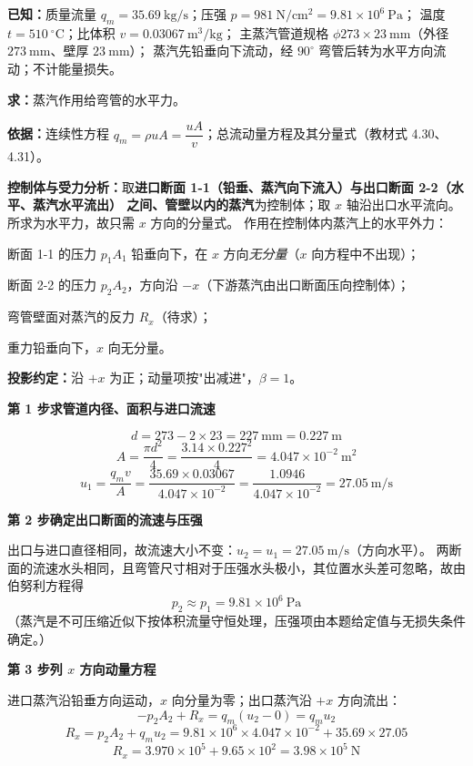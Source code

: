 \begin{jie}
\textbf{已知：}质量流量 $q_m=35.69\ \mathrm{kg/s}$；压强 $p=981\ \mathrm{N/cm^2}=9.81\times10^6\ \mathrm{Pa}$；
温度 $t=510\ \mathrm{^\circ C}$；比体积 $v=0.03067\ \mathrm{m^3/kg}$；
主蒸汽管道规格 $\phi 273\times23\ \mathrm{mm}$（外径 $273\ \mathrm{mm}$、壁厚 $23\ \mathrm{mm}$）；
蒸汽先铅垂向下流动，经 $90^\circ$ 弯管后转为水平方向流动；不计能量损失。

\textbf{求：}蒸汽作用给弯管的水平力。

\textbf{依据：}连续性方程 $q_m=\rho uA=\dfrac{uA}{v}$；总流动量方程及其分量式（教材式 4.30、4.31）。

\textbf{控制体与受力分析：}取\textbf{进口断面 1-1（铅垂、蒸汽向下流入）与出口断面 2-2（水平、蒸汽水平流出）
之间、管壁以内的蒸汽}为控制体；取 $x$ 轴沿出口水平流向。所求为水平力，故只需 $x$ 方向的分量式。
作用在控制体内蒸汽上的水平外力：
\begin{xiaowen}
\item 断面 1-1 的压力 $p_1A_1$ 铅垂向下，在 $x$ 方向\emph{无分量}（$x$ 向方程中不出现）；
\item 断面 2-2 的压力 $p_2A_2$，方向沿 $-x$（下游蒸汽由出口断面压向控制体）；
\item 弯管壁面对蒸汽的反力 $R_x$（待求）；
\item 重力铅垂向下，$x$ 向无分量。
\end{xiaowen}
\textbf{投影约定：}沿 $+x$ 为正；动量项按"出减进"，$\beta=1$。

\textbf{第 1 步\quad 求管道内径、面积与进口流速}

\[ d=273-2\times23=227\ \mathrm{mm}=0.227\ \mathrm{m} \]
\[ A=\frac{\pi d^2}{4}=\frac{3.14\times0.227^2}{4}=4.047\times10^{-2}\ \mathrm{m^2} \]
\[ u_1=\frac{q_mv}{A}=\frac{35.69\times0.03067}{4.047\times10^{-2}}=\frac{1.0946}{4.047\times10^{-2}}=27.05\ \mathrm{m/s} \]

\textbf{第 2 步\quad 确定出口断面的流速与压强}

出口与进口直径相同，故流速大小不变：$u_2=u_1=27.05\ \mathrm{m/s}$（方向水平）。
两断面的流速水头相同，且弯管尺寸相对于压强水头极小，其位置水头差可忽略，故由伯努利方程得
\[ p_2\approx p_1=9.81\times10^6\ \mathrm{Pa} \]
（蒸汽是不可压缩近似下按体积流量守恒处理，压强项由本题给定值与无损失条件确定。）

\textbf{第 3 步\quad 列 $x$ 方向动量方程}

进口蒸汽沿铅垂方向运动，$x$ 向分量为零；出口蒸汽沿 $+x$ 方向流出：
\[ -p_2A_2+R_x=q_m\left(u_2-0\right)=q_mu_2 \]
\[ R_x=p_2A_2+q_mu_2=9.81\times10^6\times4.047\times10^{-2}+35.69\times27.05 \]
\[ R_x=3.970\times10^5+9.65\times10^2=3.98\times10^5\ \mathrm{N} \]


\end{jie}
